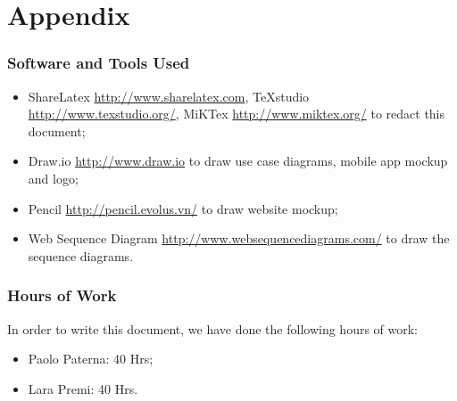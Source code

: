 \section{Appendix}
\subsubsection{Software and Tools Used}
	\begin{itemize}
		\item ShareLatex \url{http://www.sharelatex.com}, TeXstudio \url{http://www.texstudio.org/}, MiKTex \url{http://www.miktex.org/} to redact this document;
		\item Draw.io \url{http://www.draw.io} to draw use case diagrams, mobile app mockup and logo;
		\item Pencil \url{http://pencil.evolus.vn/} to draw website mockup;
		\item Web Sequence Diagram \url{http://www.websequencediagrams.com/} to draw the sequence diagrams.
	\end{itemize}
\subsubsection{Hours of Work}
	In order to write this document, we have done the following hours of work:
	\begin{itemize}
		\item Paolo Paterna: 40 Hrs;
		\item Lara Premi: 40 Hrs.
	\end{itemize}